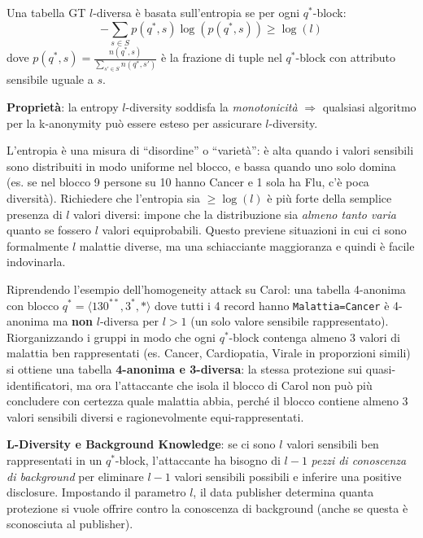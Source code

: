 \documentclass[a4paper,11pt]{article}
\begin{document}
\begin{definizione}
Una tabella GT $l$-diversa \`{e} basata sull'entropia se per ogni $q^*$-block:
\[
-\sum_{s \in S} p(q^*, s) \log(p(q^*, s)) \geq \log(l)
\]
dove $p(q^*, s) = \frac{n(q^*, s)}{\sum_{s' \in S} n(q^*, s')}$ \`{e} la frazione di tuple nel $q^*$-block con attributo sensibile uguale a $s$.

\textbf{Propriet\`{a}}: la entropy $l$-diversity soddisfa la \emph{monotonicità} $\Rightarrow$ qualsiasi algoritmo per la k-anonymity pu\`{o} essere esteso per assicurare $l$-diversity.
\end{definizione}

\begin{nota}
L'entropia è una misura di ``disordine'' o ``varietà'': è alta quando i valori sensibili sono distribuiti in modo uniforme nel blocco, e bassa quando uno solo domina (es. se nel blocco 9 persone su 10 hanno Cancer e 1 sola ha Flu, c'è poca diversità). Richiedere che l'entropia sia $\geq \log(l)$ è più forte della semplice presenza di $l$ valori diversi: impone che la distribuzione sia \emph{almeno tanto varia} quanto se fossero $l$ valori equiprobabili. Questo previene situazioni in cui ci sono formalmente $l$ malattie diverse, ma una schiacciante maggioranza e quindi è facile indovinarla.
\end{nota}

\begin{esempio}
Riprendendo l'esempio dell'homogeneity attack su Carol: una tabella 4-anonima con blocco $q^*=\langle 130^{**}, 3^*, *\rangle$ dove tutti i 4 record hanno \texttt{Malattia=Cancer} \`{e} 4-anonima ma \textbf{non} $l$-diversa per $l>1$ (un solo valore sensibile rappresentato). Riorganizzando i gruppi in modo che ogni $q^*$-block contenga almeno 3 valori di malattia ben rappresentati (es. Cancer, Cardiopatia, Virale in proporzioni simili) si ottiene una tabella \textbf{4-anonima e 3-diversa}: la stessa protezione sui quasi-identificatori, ma ora l'attaccante che isola il blocco di Carol non pu\`{o} pi\`{u} concludere con certezza quale malattia abbia, perch\'{e} il blocco contiene almeno 3 valori sensibili diversi e ragionevolmente equi-rappresentati.
\end{esempio}

\textbf{L-Diversity e Background Knowledge}: se ci sono $l$ valori sensibili ben rappresentati in un $q^*$-block, l'attaccante ha bisogno di $l-1$ \emph{pezzi di conoscenza di background} per eliminare $l-1$ valori sensibili possibili e inferire una positive disclosure. Impostando il parametro $l$, il data publisher determina quanta protezione si vuole offrire contro la conoscenza di background (anche se questa \`{e} sconosciuta al publisher).
\end{document}
